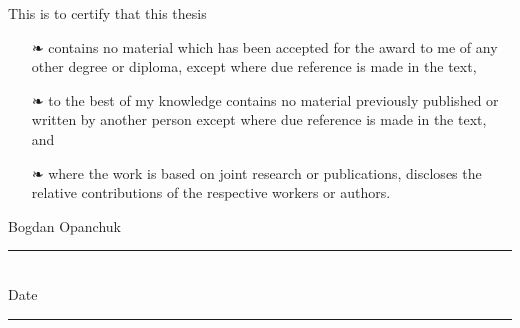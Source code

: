 
\cleardoublepage





\cleardoublepage


This is to certify that this thesis

\begin{itemize}
\item[❧] contains no material which has been accepted for the award to me of any other degree or diploma, except where due reference is made in the text,
\item[❧] to the best of my knowledge contains no material previously published or written by another person except where due reference is made in the text, and
\item[❧] where the work is based on joint research or publications, discloses the relative contributions of the respective workers or authors.
\end{itemize}

\vspace{2cm}

\begin{flushright}
Bogdan Opanchuk \hspace{0.5cm} \rule{4cm}{1pt} \\
\vspace{1cm}
Date \hspace{0.5cm} \rule{4cm}{1pt}
\end{flushright}
